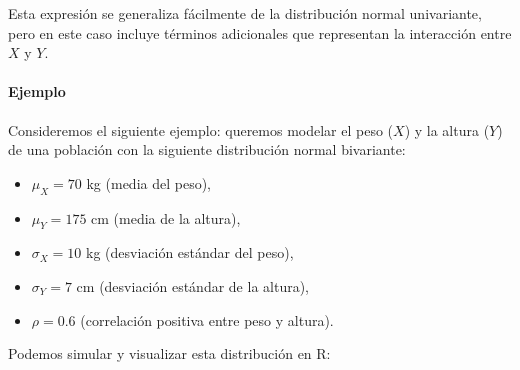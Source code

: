 \documentclass[
]{article}
\providecommand{\tightlist}{%
  \setlength{\itemsep}{0pt}\setlength{\parskip}{0pt}}
\begin{document}
Esta expresión se generaliza fácilmente de la distribución normal univariante, pero en este caso incluye términos adicionales que representan la interacción entre \(X\) y \(Y\).

\paragraph{Ejemplo}\label{ejemplo}

Consideremos el siguiente ejemplo: queremos modelar el peso (\(X\)) y la altura (\(Y\)) de una población con la siguiente distribución normal bivariante:

\begin{itemize}
\tightlist
\item
  \(\mu_X = 70\) kg (media del peso),
\item
  \(\mu_Y = 175\) cm (media de la altura),
\item
  \(\sigma_X = 10\) kg (desviación estándar del peso),
\item
  \(\sigma_Y = 7\) cm (desviación estándar de la altura),
\item
  \(\rho = 0.6\) (correlación positiva entre peso y altura).
\end{itemize}

Podemos simular y visualizar esta distribución en R:
\end{document}
